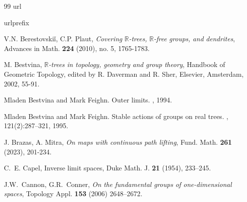 \documentclass[12pt, leqno]{amsart}
\newcommand{\bbr}{\mathbb{R}}
\theoremstyle{definition}\newtheorem{definition}[theorem]{Definition}
\begin{document}
\begin{thebibliography}{99}
\expandafter\ifx\csname url\endcsname\relax

\fi
\expandafter\ifx\csname urlprefix\endcsname\relax

\fi




 V.N. Berestovski\v{i}, C.P. Plaut, \emph{Covering $\bbr$-trees, $\bbr$-free groups, and dendrites}, Advances in Math. {\bf 224} (2010), no. 5, 1765-1783.

 M. Bestvina, \emph{$\bbr$-trees in topology, geometry and group theory}, Handbook of Geometric Topology, edited by R. Daverman and R. Sher, Elsevier, Amsterdam, 2002, 55-91.

Mladen Bestvina and Mark Feighn.
\newblock Outer limits.
, 1994.

Mladen Bestvina and Mark Feighn.
\newblock Stable actions of groups on real trees.
, 121(2):287--321, 1995.




 J. Brazas, A. Mitra, \textit{On maps with continuous path lifting}, Fund. Math. {\bf 261} (2023), 201-234.

C.~E. Capel, Inverse limit spaces, Duke Math. J. {\bf 21} (1954), 233--245.

 J.W.~Cannon, G.R.~Conner, \textit{On the fundamental groups of one-dimensional spaces}, Topology Appl. {\bf 153} (2006) 2648--2672.






\end{thebibliography}
\end{document}
